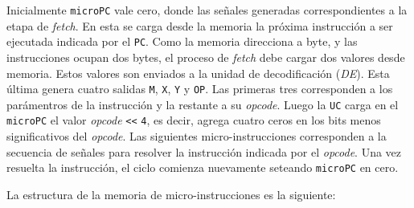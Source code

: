 \documentclass[a4paper,11pt]{article}
\begin{document}
Inicialmente \texttt{microPC} vale cero, donde las señales generadas correspondientes a la etapa de \emph{fetch}.
En esta se carga desde la memoria la próxima instrucción a ser ejecutada indicada por el \texttt{PC}.
Como la memoria direcciona a byte, y las instrucciones ocupan dos bytes, el proceso de \emph{fetch} debe cargar dos valores desde memoria.
Estos valores son enviados a la unidad de decodificación (\emph{DE}).
Esta última genera cuatro salidas \texttt{M}, \texttt{X}, \texttt{Y} y \texttt{OP}.
Las primeras tres corresponden a los parámentros de la instrucción y la restante a su \emph{opcode}.
Luego la \texttt{UC} carga en el \texttt{microPC} el valor \emph{opcode} \verb|<<| \texttt{4}, es decir, agrega cuatro ceros en los bits menos significativos del \emph{opcode}.
Las siguientes micro-instrucciones corresponden a la secuencia de señales para resolver la instrucción indicada por el \emph{opcode}.
Una vez resuelta la instrucción, el ciclo comienza nuevamente seteando \texttt{microPC} en cero.

\bigskip

\noindent La estructura de la memoria de micro-instrucciones es la siguiente:
\end{document}
